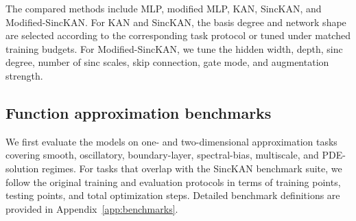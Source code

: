 \documentclass[preprint,12pt]{elsarticle}
\begin{document}
The compared methods include MLP, modified MLP, KAN, SincKAN, and Modified-SincKAN. For KAN and SincKAN, the basis degree and network shape are selected according to the corresponding task protocol or tuned under matched training budgets. For Modified-SincKAN, we tune the hidden width, depth, sinc degree, number of sinc scales, skip connection, gate mode, and augmentation strength.

\subsection{Function approximation benchmarks}

We first evaluate the models on one- and two-dimensional approximation tasks covering smooth, oscillatory, boundary-layer, spectral-bias, multiscale, and PDE-solution regimes. For tasks that overlap with the SincKAN benchmark suite, we follow the original training and evaluation protocols in terms of training points, testing points, and total optimization steps. Detailed benchmark definitions are provided in Appendix~\ref{app:benchmarks}.
\end{document}
